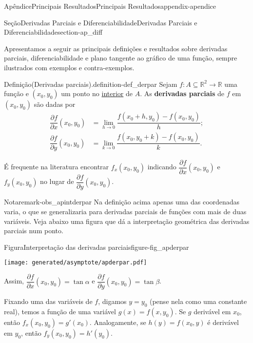\documentclass[oneside,10pt,]{book}
\newcommand{\terminology}[1]{\textbf{#1}}
\numberwithin{equation}{section}
\newcommand{\R}{\mathbb R}
\begin{document}
\begin{appendixptx}{Apêndice}{Principais Resultados}{}{Principais Resultados}{}{}{appendix-apendice}
\begin{sectionptx}{Seção}{Derivadas Parciais e Diferenciabilidade}{}{Derivadas Parciais e Diferenciabilidade}{}{}{section-ap_diff}
\begin{introduction}{}%
Apresentamos a seguir as principais definições e resultados sobre derivadas parciais, diferenciabilidade e plano tangente ao gráfico de uma função, sempre ilustrados com exemplos e contra-exemplos.%
\end{introduction}%
\begin{definition}{Definição}{(Derivadas parciais).}{definition-def_derpar}%
Sejam \(f\colon A\subseteq\R^2\to\R\) uma função e \((x_0,y_0)\) um ponto no \href{https://pt.wikipedia.org/wiki/Interior_(topologia)}{interior}\footnotemark{} de \(A\). As \terminology{derivadas parciais} de \(f\) em \((x_0,y_0)\) são dadas por%
\begin{align*}
\dfrac{\partial f}{\partial x}(x_0,y_0)
&=\lim\limits_{h\to
0}\dfrac{f(x_0+h,y_0)-f(x_0,y_0)}{h};\\
\dfrac{\partial f}{\partial y}(x_0,y_0)
&=\lim\limits_{k\to
0}\dfrac{f(x_0,y_0+k)-f(x_0,y_0)}{k}.
\end{align*}
%
\par
É frequente na literatura encontrar \(f_x(x_0,y_0)\) indicando \(\dfrac{\partial f}{\partial x}(x_0,y_0)\) e \(f_y(x_0,y_0)\) no lugar de \(\dfrac{\partial f}{\partial
y}(x_0,y_0)\).%
\end{definition}
%
\begin{remark}{Nota}{}{remark-obs_apintderpar}%
Na definição acima apenas uma das coordenadas varia, o que se generalizaria para derivadas parciais de funções com mais de duas variáveis. Veja abaixo uma figura que dá a interpretação geométrica das derivadas parciais num ponto. \begin{figureptx}{Figura}{Interpretação das derivadas parciais}{figure-fig_apderpar}{}%
\begin{image}{0.25}{0.5}{0.25}{}%
\texttt{[image: generated/asymptote/apderpar.pdf]}
\end{image}%
\tcblower
\end{figureptx}%
%
\par
Assim, \(\dfrac{\partial f}{\partial x}(x_0,y_0)=\tan \alpha\) e \(\dfrac{\partial f}{\partial y}(x_0,y_0)=\tan \beta\).%
\par
Fixando uma das variáveis de \(f\), digamos \(y=y_0\) (pense nela como uma constante real), temos a função de uma variável \(g(x)=f(x,y_0)\). Se \(g\) derivável em \(x_0\), então \(f_x(x_0,y_0)=g'(x_0)\). Analogamente, se \(h(y)=f(x_0,y)\) é derivável em \(y_0\), então \(f_y(x_0,y_0)=h'(y_0)\).%

\end{remark}
\end{sectionptx}
\end{appendixptx}
\end{document}
